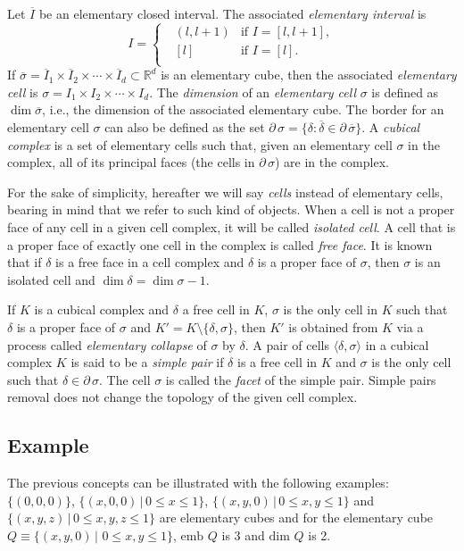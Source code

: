 \documentclass[journal]{IEEEtran}
\begin{document}
Let $\overline{I}$ be an elementary closed interval. The associated \emph{elementary interval} is
$$I =
\left\{
\begin{array}{ll}
\mbox{ }(l, l+1) & \mbox{if } I = [l,l+1],\\
\mbox{ }[l ] & \mbox{if } I = [l ].\\
\end{array}
\right.
$$
\noindent If $\overline{\sigma} = \overline{I}_1 \times \overline{I}_2 \times
\cdots \times \overline{I}_d \subset \mathbb{R}^d$ is an elementary cube, then
the associated \emph{elementary cell} is $ \sigma = I_1 \times I_2 \times \cdots
\times I_d $. The \emph{dimension} of an \emph{elementary cell} $\sigma$ is
defined as $\dim \overline{\sigma}$, i.e., the dimension of the associated
elementary cube. The border for an elementary cell $\sigma$ can also be defined
as the set $\partial\, \sigma = \{\delta: \overline{\delta} \in \partial\,
\overline{\sigma}\}$. A \emph{cubical complex} is a set of elementary cells such
that, given an elementary cell $\sigma$ in the complex, all of its principal
faces (the cells in $\partial\, \sigma$) are in the complex.

For the sake of simplicity, hereafter we will say \emph{cells} instead of
elementary cells, bearing in mind that we refer to such kind of objects. When a
cell is not a proper face of any cell in a given cell complex, it will be called
\emph{isolated cell}. A cell that is a proper face of exactly one cell in the
complex is called \emph{free face}. It is known that if $\delta$ is a free face
in a cell complex and $\delta$ is a proper face of $\sigma$, then $\sigma$ is an
isolated cell and $\dim \delta = \dim \sigma - 1$.

If $K$ is a cubical complex and $\delta$ a free cell in $K$, $\sigma$ is the
only cell in $K$ such that $\delta$ is a proper face of $\sigma$ and
$K'=K\setminus \{\delta, \sigma\}$, then $K'$ is obtained from $K$ via a process
called \emph{elementary collapse} of $\sigma$ by $\delta$.
A pair of cells
$\langle \delta, \sigma \rangle$ in a cubical complex $K$ is said to be a
\emph{simple pair} if $\delta$ is a free cell in $K$ and $\sigma$ is the only
cell such that $\delta \in \partial\, \sigma$. The cell $\sigma$ is called the
\emph{facet} of the simple pair. Simple pairs removal does not change the
topology of the given cell complex.

\subsection{Example}
The previous concepts can be illustrated with the following examples:
$\{(0,0,0)\}$, $\{(x,0,0)\,|\, 0\leq x \leq 1\}$, $\{(x,y,0)\,|\, 0\leq x,y \leq
1\}$ and $\{(x,y,z)\,|\, 0\leq x,y,z \leq 1\}$ are elementary cubes and for the
elementary cube $Q\equiv\{(x,y,0)\,|$ $0\leq x,y \leq 1\}$, $\mbox{emb } Q$ is 3
and $\mbox{dim } Q$ is 2.
\end{document}
